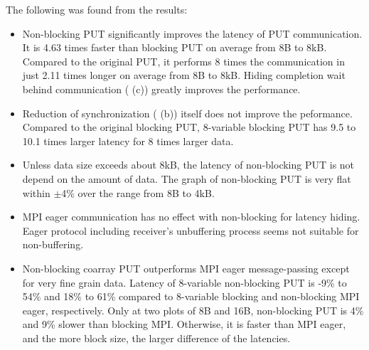The following was found from the results:
\begin{itemize}
\item
Non-blocking PUT significantly improves the latency of PUT communication. 
It is 4.63 times faster than blocking PUT on average from 8B to 8kB. 
Compared to the original PUT, it performs 8 times the communication in just 
2.11 times longer on average from 8B to 8kB.
Hiding completion wait behind communication ( (c))
greatly improves the performance.

\item
Reduction of synchronization ( (b)) itself does not
improve the peformance. Compared to the original blocking PUT, 
8-variable blocking PUT has 9.5 to 10.1 times larger latency for 8 times
larger data.

\item
Unless data size exceeds about 8kB, the latency of non-blocking PUT is not
depend on the amount of data. 
The graph of non-blocking PUT is very flat within $\pm$4\% over the range 
from 8B to 4kB.

\item 
MPI eager communication has no effect with non-blocking for latency hiding.
Eager protocol including receiver's unbuffering process seems not suitable for
non-buffering.

\item 
Non-blocking coarray PUT outperforms MPI eager message-passing
except for very fine grain data.
Latency of 8-variable non-blocking PUT is  -9\% to 54\% and 18\% to 61\% 
compared to 8-variable blocking and non-blocking MPI eager, respectively.
Only at two plots of 8B and 16B, non-blocking PUT is 4\% and 9\% slower 
than blocking MPI. Otherwise, it is faster than MPI eager, and
the more block size, the larger difference of the latencies.

\end{itemize}


